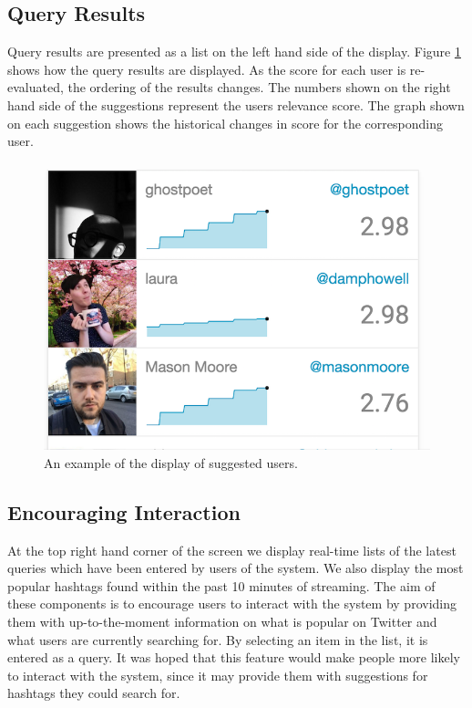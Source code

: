 \documentclass{l4proj}
\begin{document}
        \subsection{Query Results}
        Query results are presented as a list on the left hand side of the display. Figure \ref{queryresults} shows how the query results are displayed. As the score for each user is re-evaluated, the ordering of the results changes. The numbers shown on the right hand side of the suggestions represent the users relevance score. The graph shown on each suggestion shows the historical changes in score for the corresponding user.
        
\begin{figure}[H]
\centering
\includegraphics[scale=0.9]{queryresults.png}
\caption{An example of the display of suggested users.}
\label{queryresults}
\end{figure} 
        
        \subsection{Encouraging Interaction}
        At the top right hand corner of the screen we display real-time lists of the latest queries which have been entered by users of the system. We also display the most popular hashtags found within the past 10 minutes of streaming. The aim of these components is to encourage users to interact with the system by providing them with up-to-the-moment information on what is popular on Twitter and what users are currently searching for. By selecting an item in the list, it is entered as a query. It was hoped that this feature would make people more likely to interact with the system, since it may provide them with suggestions for hashtags they could search for.
        
\end{document}
